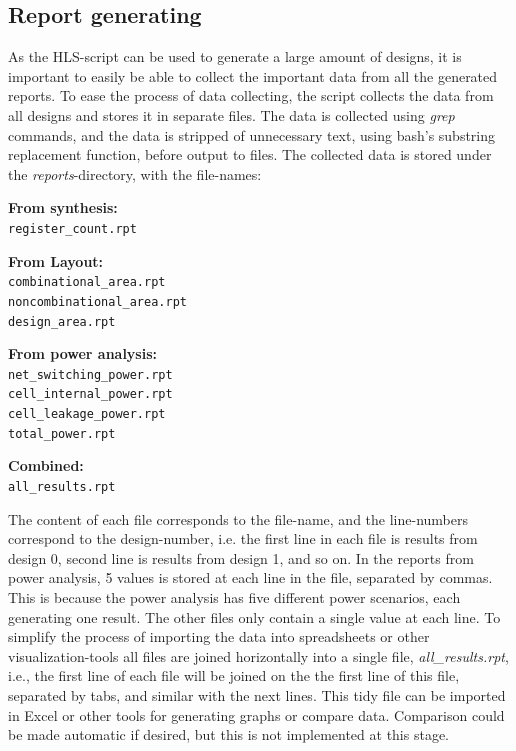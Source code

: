 \subsection{Report generating}
As the HLS-script can be used to generate a large amount of designs, it is important to easily be able to collect the important data from all the generated reports. To ease the process of data collecting, the script collects the data from all designs and stores it in separate files. The data is collected using \textit{grep} commands, and the data is stripped of unnecessary text, using bash's substring replacement function, before output to files. The collected data is stored under the \textit{reports}-directory, with the file-names:
\begin{multicols}{2}
\textbf{From synthesis:}\\
\verb!register_count.rpt!

\textbf{From Layout:}\\
\verb!combinational_area.rpt!\\
\verb!noncombinational_area.rpt!\\
\verb!design_area.rpt!

\textbf{From power analysis:}\\
\verb!net_switching_power.rpt!\\
\verb!cell_internal_power.rpt!\\
\verb!cell_leakage_power.rpt!\\
\verb!total_power.rpt!

\textbf{Combined:}\\
\verb!all_results.rpt!
\end{multicols}

The content of each file corresponds to the file-name, and the line-numbers correspond to the design-number, i.e. the first line in each file is results from design 0, second line is results from design 1, and so on. In the reports from power analysis, 5 values is stored at each line in the file, separated by commas. This is because the power analysis has five different power scenarios, each generating one result. The other files only contain a single value at each line. To simplify the process of importing the data into spreadsheets or other visualization-tools all files are joined horizontally into a single file, \textit{all\_results.rpt}, i.e., the first line of each file will be joined on the the first line of this file, separated by tabs, and similar with the next lines. This tidy file can be imported in Excel or other tools for generating graphs or compare data. Comparison could be made automatic if desired, but this is not implemented at this stage.

